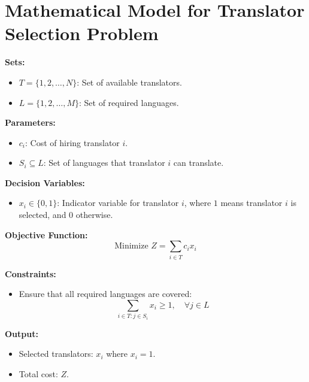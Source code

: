 \documentclass{article}
\begin{document}
\section*{Mathematical Model for Translator Selection Problem}

\textbf{Sets:}
\begin{itemize}
    \item $T = \{1, 2, \ldots, N\}$: Set of available translators.
    \item $L = \{1, 2, \ldots, M\}$: Set of required languages.
\end{itemize}

\textbf{Parameters:}
\begin{itemize}
    \item $c_i$: Cost of hiring translator $i$.
    \item $S_i \subseteq L$: Set of languages that translator $i$ can translate.
\end{itemize}

\textbf{Decision Variables:}
\begin{itemize}
    \item $x_i \in \{0, 1\}$: Indicator variable for translator $i$, where $1$ means translator $i$ is selected, and $0$ otherwise.
\end{itemize}

\textbf{Objective Function:}
\[
\text{Minimize } Z = \sum_{i \in T} c_i x_i
\]

\textbf{Constraints:}
\begin{itemize}
    \item Ensure that all required languages are covered:
    \[
    \sum_{i \in T: j \in S_i} x_i \geq 1, \quad \forall j \in L
    \]
\end{itemize}

\textbf{Output:}
\begin{itemize}
    \item Selected translators: $x_i$ where $x_i = 1$.
    \item Total cost: $Z$.
\end{itemize}
\end{document}
